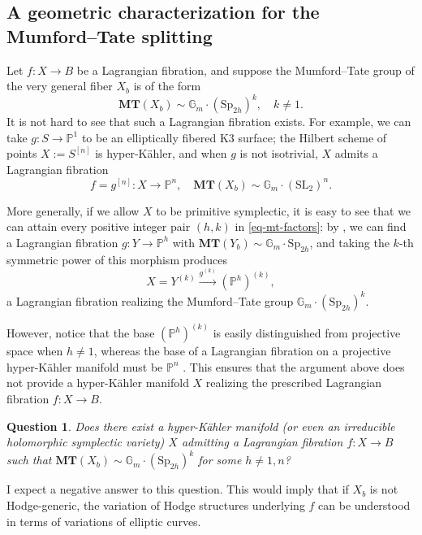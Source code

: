 \documentclass[12pt]{amsart}
\newcommand{\bbP}{\mathbb{P}}
\newcommand{\Sp}{\mathrm{Sp}}
\newcommand{\SL}{\mathrm{SL}}
\newtheorem{question}[theorem]{Question}
\theoremstyle{definition}
\numberwithin{equation}{section}
\begin{document}
\subsection{A geometric characterization for the Mumford--Tate splitting}
Let \(f: X \to B\) be a Lagrangian fibration, and suppose the Mumford--Tate 
group of the very general fiber \(X_b\) is of the form 
\begin{equation} \label{eq-mt-factors}
    \mathbf{MT}(X_b) \sim \mathbb{G}_m \cdot (\Sp_{2h})^k, \quad k \neq 1.
\end{equation}
It is not hard to see that such a Lagrangian fibration exists. For example, we can take 
\(g: S \to \bbP^1\) to be an elliptically fibered K3 surface; the Hilbert scheme of points 
\(X := S^{[n]}\) is hyper-K\"ahler, and when \(g\) is not isotrivial, \(X\) admits 
a Lagrangian fibration 
\[f = g^{[n]}: X \to \bbP^n, \quad \mathbf{MT}(X_b) \sim 
\mathbb{G}_m \cdot (\SL_2)^n.\]

More generally, if we allow \(X\) to be primitive symplectic, it is easy to see that 
we can attain every positive integer pair \((h, k)\) in \eqref{eq-mt-factors}: 
by , we can find a Lagrangian fibration \(g: Y \to \bbP^h\) with 
\(\mathbf{MT}(Y_b) \sim \mathbb{G}_m \cdot \Sp_{2h}\), and taking the \(k\)-th symmetric 
power of this morphism produces 
\begin{equation*}
    X = Y^{(k)} \xrightarrow{g^{(k)}} (\bbP^h)^{(k)},
\end{equation*}
a Lagrangian fibration realizing the Mumford--Tate group 
\(\mathbb{G}_m \cdot (\Sp_{2h})^k\).

However, notice that the base \((\bbP^h)^{(k)}\) is easily distinguished from 
projective space when \(h \neq 1\), whereas the base of a Lagrangian fibration
on a projective hyper-K\"ahler manifold must be \(\bbP^n\) \cite{openai-matsushita}.
This ensures that the argument above does not 
provide a hyper-K\"ahler manifold \(X\) realizing the prescribed Lagrangian 
fibration \(f: X \to B\).


\begin{question} \label{question-classification}
    Does there exist a hyper-K\"ahler manifold (or even an irreducible holomorphic 
    symplectic variety) \(X\) admitting a Lagrangian fibration \(f: X \to B\) 
    such that \(\mathbf{MT}(X_b) \sim \mathbb{G}_m \cdot (\Sp_{2h})^k\) for some 
    \(h \neq 1, n\)?
\end{question}

I expect a negative answer to this question. This would imply that if \(X_b\) is not 
Hodge-generic, the variation of Hodge structures underlying \(f\) can be understood 
in terms of variations of elliptic curves. 
\end{document}
